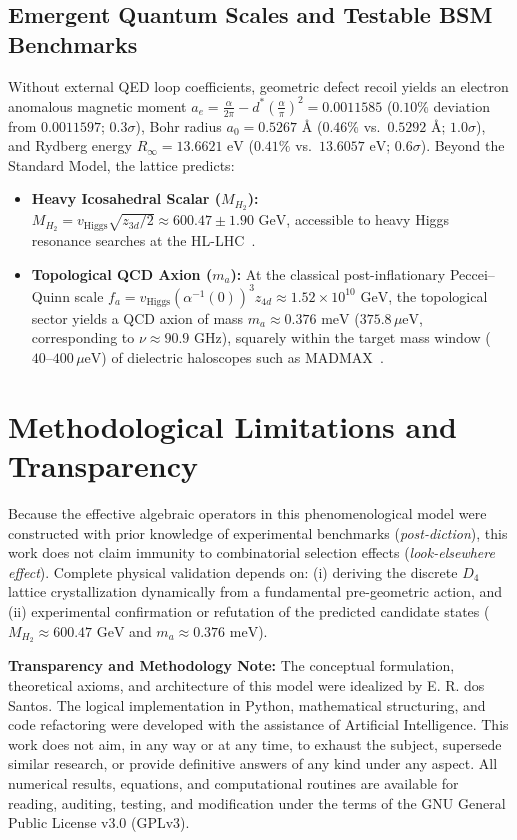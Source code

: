 \documentclass[11pt,a4paper]{article}
\begin{document}
\subsection{Emergent Quantum Scales and Testable BSM Benchmarks}
Without external QED loop coefficients, geometric defect recoil yields an electron anomalous magnetic moment $a_e = \frac{\alpha}{2\pi} - d^*\left(\frac{\alpha}{\pi}\right)^2 = 0.0011585$ ($0.10\%$ deviation from $0.0011597$; $0.3\sigma$), Bohr radius $a_0 = 0.5267\text{ \AA}$ ($0.46\%$ vs.\ $0.5292\text{ \AA}$; $1.0\sigma$), and Rydberg energy $R_\infty = 13.6621\text{ eV}$ ($0.41\%$ vs.\ $13.6057\text{ eV}$; $0.6\sigma$). Beyond the Standard Model, the lattice predicts:
\begin{itemize}
    \item \textbf{Heavy Icosahedral Scalar ($M_{H_2}$):} $M_{H_2} = v_{\text{Higgs}}\sqrt{z_{3d}/2} \approx 600.47 \pm 1.90\text{ GeV}$, accessible to heavy Higgs resonance searches at the HL-LHC~\cite{HLLHC2019}.
    \item \textbf{Topological QCD Axion ($m_a$):} At the classical post-inflationary Peccei--Quinn scale $f_a = v_{\text{Higgs}}(\alpha^{-1}(0))^3 z_{4d} \approx 1.52 \times 10^{10}\text{ GeV}$, the topological sector yields a QCD axion of mass $m_a \approx 0.376\text{ meV}$ ($375.8\,\mu\text{eV}$, corresponding to $\nu \approx 90.9\text{ GHz}$), squarely within the target mass window ($40\text{--}400\,\mu\text{eV}$) of dielectric haloscopes such as MADMAX~\cite{MADMAX2017}.
\end{itemize}

\section{Methodological Limitations and Transparency}
Because the effective algebraic operators in this phenomenological model were constructed with prior knowledge of experimental benchmarks (\emph{post-diction}), this work does not claim immunity to combinatorial selection effects (\emph{look-elsewhere effect}). Complete physical validation depends on: (i) deriving the discrete $D_4$ lattice crystallization dynamically from a fundamental pre-geometric action, and (ii) experimental confirmation or refutation of the predicted candidate states ($M_{H_2} \approx 600.47\text{ GeV}$ and $m_a \approx 0.376\text{ meV}$).

\medskip
\noindent\textbf{Transparency and Methodology Note:} The conceptual formulation, theoretical axioms, and architecture of this model were idealized by E. R. dos Santos. The logical implementation in Python, mathematical structuring, and code refactoring were developed with the assistance of Artificial Intelligence. This work does not aim, in any way or at any time, to exhaust the subject, supersede similar research, or provide definitive answers of any kind under any aspect. All numerical results, equations, and computational routines are available for reading, auditing, testing, and modification under the terms of the GNU General Public License v3.0 (GPLv3).
\end{document}

